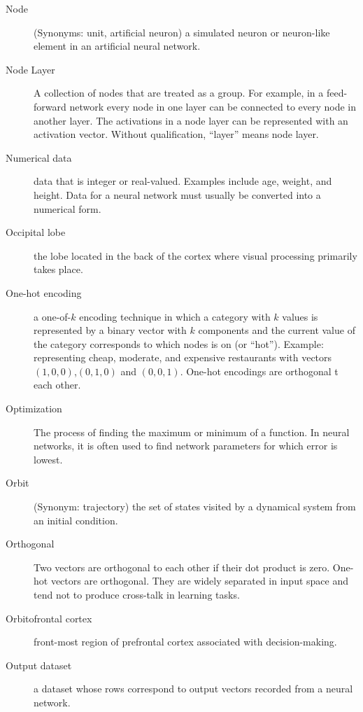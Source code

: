 \begin{description}
\item[Node] (Synonyms: unit, artificial neuron) a simulated neuron or neuron-like element in an artificial neural network. 

\item[Node Layer] A collection of nodes that are treated as a group. For example, in a feed-forward network every node in one layer can be connected to every node in another layer. The activations in a node layer can be represented with an activation vector. Without qualification, ``layer'' means node layer.

\item[Numerical data] data that is integer or real-valued. Examples include age, weight, and height. Data for a neural network must usually be converted into a numerical form.

\item[Occipital lobe] the lobe located in the back of the cortex where visual processing primarily takes place. 

\item[One-hot encoding] a one-of-$k$ encoding technique in which  a category with $k$ values is represented by a binary vector with $k$ components and the current value of the category corresponds to which nodes is on (or ``hot''). Example: representing cheap, moderate, and expensive restaurants with vectors $(1,0,0)$,$(0,1,0)$ and $(0,0,1)$. One-hot encodings are orthogonal t each other.

\item[Optimization] The process of finding the maximum or minimum of a function. In neural networks, it is often used to find network parameters for which error is lowest.

\item[Orbit] (Synonym: trajectory) the set of states visited by a dynamical system from an initial condition. 

\item[Orthogonal] Two vectors are orthogonal to each other if their dot product is zero. One-hot vectors are orthogonal. They are widely separated in input space and tend not to produce cross-talk in learning tasks.

\item[Orbitofrontal cortex] front-most region of prefrontal cortex associated with decision-making.

\item[Output dataset] a dataset whose rows correspond to output vectors recorded from a neural network. 


\end{description}
